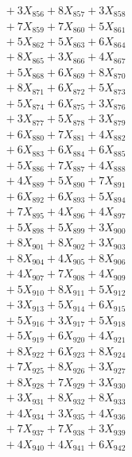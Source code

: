 \documentclass[a4paper,10pt]{article}
\begin{document}
{\begin{align}
&\;  + 3 X_{856} + 8 X_{857} + 3 X_{858} \\[0.3ex]
&\;  + 7 X_{859} + 7 X_{860} + 5 X_{861} \\[0.3ex]
&\;  + 5 X_{862} + 5 X_{863} + 6 X_{864} \\[0.3ex]
&\;  + 8 X_{865} + 3 X_{866} + 4 X_{867} \\[0.3ex]
&\;  + 5 X_{868} + 6 X_{869} + 8 X_{870} \\[0.3ex]
&\;  + 8 X_{871} + 6 X_{872} + 5 X_{873} \\[0.3ex]
&\;  + 5 X_{874} + 6 X_{875} + 3 X_{876} \\[0.3ex]
&\;  + 3 X_{877} + 5 X_{878} + 3 X_{879} \\[0.5ex]\allowbreak
&\;  + 6 X_{880} + 7 X_{881} + 4 X_{882} \\[0.3ex]
&\;  + 6 X_{883} + 6 X_{884} + 6 X_{885} \\[0.3ex]
&\;  + 5 X_{886} + 7 X_{887} + 4 X_{888} \\[0.3ex]
&\;  + 4 X_{889} + 5 X_{890} + 7 X_{891} \\[0.3ex]
&\;  + 6 X_{892} + 6 X_{893} + 5 X_{894} \\[0.3ex]
&\;  + 7 X_{895} + 4 X_{896} + 4 X_{897} \\[0.3ex]
&\;  + 5 X_{898} + 5 X_{899} + 3 X_{900} \\[0.3ex]
&\;  + 8 X_{901} + 8 X_{902} + 3 X_{903} \\[0.3ex]
&\;  + 8 X_{904} + 4 X_{905} + 8 X_{906} \\[0.3ex]
&\;  + 4 X_{907} + 7 X_{908} + 4 X_{909} \\[0.5ex]\allowbreak
&\;  + 5 X_{910} + 8 X_{911} + 5 X_{912} \\[0.3ex]
&\;  + 3 X_{913} + 5 X_{914} + 6 X_{915} \\[0.3ex]
&\;  + 5 X_{916} + 3 X_{917} + 5 X_{918} \\[0.3ex]
&\;  + 5 X_{919} + 6 X_{920} + 4 X_{921} \\[0.3ex]
&\;  + 8 X_{922} + 6 X_{923} + 8 X_{924} \\[0.3ex]
&\;  + 7 X_{925} + 8 X_{926} + 3 X_{927} \\[0.3ex]
&\;  + 8 X_{928} + 7 X_{929} + 3 X_{930} \\[0.3ex]
&\;  + 3 X_{931} + 8 X_{932} + 8 X_{933} \\[0.3ex]
&\;  + 4 X_{934} + 3 X_{935} + 4 X_{936} \\[0.3ex]
&\;  + 7 X_{937} + 7 X_{938} + 3 X_{939} \\[0.5ex]\allowbreak
&\;  + 4 X_{940} + 4 X_{941} + 6 X_{942} \\[0.3ex]

\end{align}}
\end{document}
